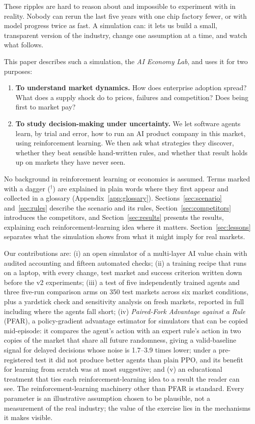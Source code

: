\documentclass[11pt]{article}
\begin{document}
These ripples are hard to reason about and impossible to experiment with in reality. Nobody can rerun the last five years with one chip factory fewer, or with model progress twice as fast. A simulation can: it lets us build a small, transparent version of the industry, change one assumption at a time, and watch what follows.

This paper describes such a simulation, the \emph{AI Economy Lab}, and uses it for two purposes:
\begin{enumerate}
  \item \textbf{To understand market dynamics.} How does enterprise adoption spread? What does a supply shock do to prices, failures and competition? Does being first to market pay?
  \item \textbf{To study decision-making under uncertainty.} We let software agents learn, by trial and error, how to run an AI product company in this market, using reinforcement learning. We then ask what strategies they discover, whether they beat sensible hand-written rules, and whether that result holds up on markets they have never seen.
\end{enumerate}

No background in reinforcement learning or economics is assumed. Terms marked with a dagger ($^\dagger$) are explained in plain words where they first appear and collected in a glossary (Appendix~\ref{app:glossary}). Sections~\ref{sec:scenario} and~\ref{sec:rules} describe the scenario and its rules, Section~\ref{sec:competitors} introduces the competitors, and Section~\ref{sec:results} presents the results, explaining each reinforcement-learning idea where it matters. Section~\ref{sec:lessons} separates what the simulation shows from what it might imply for real markets.

Our contributions are: (i) an open simulator of a multi-layer AI value chain with audited accounting and fifteen automated checks; (ii) a training recipe that runs on a laptop, with every change, test market and success criterion written down before the v2 experiments; (iii) a test of five independently trained agents and three five-run comparison arms on 350 test markets across six market conditions, plus a yardstick check and sensitivity analysis on fresh markets, reported in full including where the agents fall short; (iv) \emph{Paired-Fork Advantage against a Rule} (PFAR), a policy-gradient advantage estimator for simulators that can be copied mid-episode: it compares the agent's action with an expert rule's action in two copies of the market that share all future randomness, giving a valid-baseline signal for delayed decisions whose noise is 1.7--3.9 times lower; under a pre-registered test it did not produce better agents than plain PPO, and its benefit for learning from scratch was at most suggestive; and (v) an educational treatment that ties each reinforcement-learning idea to a result the reader can see. The reinforcement-learning machinery other than PFAR is standard. Every parameter is an illustrative assumption chosen to be plausible, not a measurement of the real industry; the value of the exercise lies in the mechanisms it makes visible.
\end{document}
